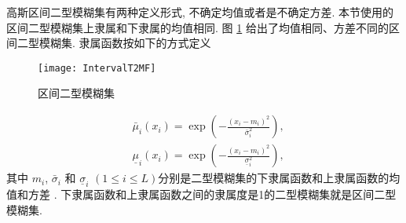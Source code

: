 高斯区间二型模糊集有两种定义形式,  不确定均值或者是不确定方差. 本节使用的区间二型模糊集上隶属和下隶属的均值相同.
图 \ref{TFLN:fig1-2} 给出了均值相同、方差不同的区间二型模糊集. 隶属函数按如下的方式定义
\begin{figure} [!htp]
    \begin{center}
        \texttt{[image: IntervalT2MF]}
    \end{center}
    \caption{区间二型模糊集}
    \label{TFLN:fig1-2}
\end{figure}
\begin{align}
    &\bar{\mu} _{i} (x_i)=\exp\left(- \frac{(x_i-m_{i} )^2} {\bar{\sigma} ^2_{i} }  \right),\label{IT2TSKNM_mu1} \\
    &\underline{\mu} _{i} (x_i)=\exp\left(- \frac{(x_i-m_{i} )^2} {\underline{\sigma} ^2_{i} }  \right),
    \label{IT2TSKNM_mu2}
\end{align}
其中 $m_{i} $, $\bar{\sigma} _{i} $ 和 $\underline{\sigma} _{i} $ $(1\leq i\leq L)$分别是二型模糊集的下隶属函数和上隶属函数的均值和方差 . 下隶属函数和上隶属函数之间的隶属度是1的二型模糊集就是区间二型模糊集.

